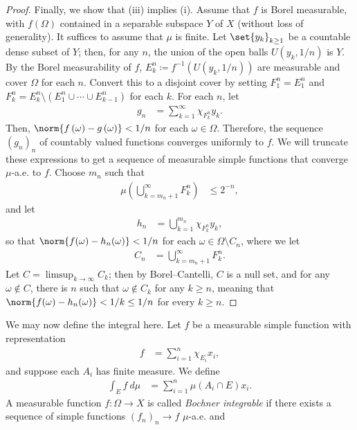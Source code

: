 \documentclass[10pt]{mypackage}
\begin{document}
\begin{proof}
  Finally, we show that (iii) implies (i). Assume that $f$ is Borel measurable, with $f(\Omega)$ contained in a separable subspace $Y$ of $X$ (without loss of generality). It suffices to assume that $\mu$ is finite. Let $\set{y_k}_{k\geq 1}$ be a countable dense subset of $Y$; then, for any $n$, the union of the open balls $U\left( y_k,1/n \right)$ is $Y$. By the Borel measurability of $f$, $E_{k}^n\coloneq f^{-1}\left( U\left( y_k,1/n \right) \right)$ are measurable and cover $\Omega$ for each $n$. Convert this to a disjoint cover by setting $F_1^n = E_1^n$ and $F_k^n = E_k^n\setminus \left( E_1^n\cup\cdots\cup E_{k-1}^n \right)$ for each $k$. For each $n$, let 
  \begin{align*}
    g_n &= \sum_{k=1}^{\infty}\chi_{F_k^n}y_k.
  \end{align*}
  Then, $\norm{f\left( \omega \right)-g\left( \omega \right)} < 1/n$ for each $\omega\in \Omega$. Therefore, the sequence $\left( g_n \right)_n$ of countably valued functions converges uniformly to $f$. We will truncate these expressions to get a sequence of measurable simple functions that converge $\mu$-a.e. to $f$. Choose $m_n$ such that
  \begin{align*}
    \mu\left( \bigcup_{k=m_n+1}^{\infty}F_k^n \right) &\leq 2^{-n},
  \end{align*}
  and let
  \begin{align*}
    h_n &= \bigcup_{k=1}^{m_n} \chi_{F_k^n}y_k,
  \end{align*}
  so that $\norm{f(\omega)-h_n(\omega)} < 1/n$ for each $\omega\in \Omega\setminus C_n$, where we let
  \begin{align*}
    C_n &= \bigcup_{k=m_n+1}^{\infty}F_k^n.
  \end{align*}
  Let $C = \limsup_{k\rightarrow\infty}C_k$; then by Borel--Cantelli, $C$ is a null set, and for any $\omega\notin C$, there is $n$  such that $\omega\notin C_k$ for any $k\geq n$, meaning that $\norm{f(\omega)-h_n(\omega)} < 1/k \leq 1/n$ for every $k\geq n$.
\end{proof}
We may now define the integral here. Let $f$ be a measurable simple function with representation
\begin{align*}
  f &= \sum_{i=1}^{n}\chi_{E_i}x_i,
\end{align*}
and suppose each $A_i$ has finite measure. We define
\begin{align*}
  \int_{E}^{} f\:d\mu &= \sum_{i=1}^{n} \mu\left( A_i\cap E \right)x_i.
\end{align*}
A measurable function $f\colon \Omega\rightarrow X$ is called \textit{Bochner integrable} if there exists a sequence of simple functions $\left( f_n \right)_n\rightarrow f$ $\mu$-a.e. and
\end{document}

